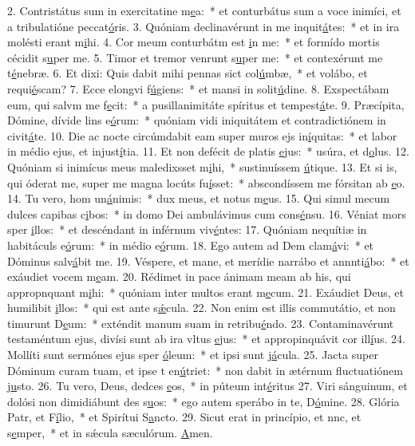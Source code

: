 2. Contristátus sum in exercitatine m\uline{e}a:~* et conturbátus sum a voce inimíci, et a tribulatióne peccat\uline{ó}ris.
3. Quóniam declinavérunt in me inquit\uline{á}tes:~* et in ira molésti erant m\uline{i}hi.
4. Cor meum conturbátm est \uline{i}n me:~* et formído mortis cécidit s\uline{u}per me.
5. Timor et tremor venrunt s\uline{u}per me:~* et contexérunt me t\uline{é}nebræ.
6. Et dixi: Quis dabit mihi pennas sict col\uline{ú}mbæ,~* et volábo, et requi\uline{é}scam?
7. Ecce elongvi f\uline{ú}giens:~* et mansi in solit\uline{ú}dine.
8. Exspectábam eum, qui salvm me f\uline{e}cit:~* a pusillanimitáte spíritus et tempest\uline{á}te.
9. Præcípita, Dómine, dívide lins e\uline{ó}rum:~* quóniam vidi iniquitátem et contradictiónem in civit\uline{á}te.
10. Die ac nocte circúmdabit eam super muros ejs in\uline{í}quitas:~* et labor in médio ejus, et injust\uline{í}tia.
11. Et non defécit de platis \uline{e}jus:~* usúra, et d\uline{o}lus.
12. Quóniam si inimícus meus maledixsset m\uline{i}hi,~* sustinuíssem \uline{ú}tique.
13. Et si is, qui óderat me, super me magna locúts fu\uline{í}sset:~* abscondíssem me fórsitan ab \uline{e}o.
14. Tu vero, hom un\uline{á}nimis:~* dux meus, et notus m\uline{e}us.
15. Qui simul mecum dulces capibas c\uline{i}bos:~* in domo Dei ambulávimus cum cons\uline{é}nsu.
16. Véniat mors sper \uline{i}llos:~* et descéndant in inférnum viv\uline{é}ntes:
17. Quóniam nequítiæ in habitáculs e\uline{ó}rum:~* in médio e\uline{ó}rum.
18. Ego autem ad Dem clam\uline{á}vi:~* et Dóminus salv\uline{á}bit me.
19. Véspere, et mane, et merídie narrábo et annnti\uline{á}bo:~* et exáudiet vocem m\uline{e}am.
20. Rédimet in pace ánimam meam ab his, qui appropnquant m\uline{i}hi:~* quóniam inter multos erant m\uline{e}cum.
21. Exáudiet Deus, et humilibit \uline{i}llos:~* qui est ante s\uline{ǽ}cula.
22. Non enim est illis commutátio, et non timurunt D\uline{e}um:~* exténdit manum suam in retribu\uline{é}ndo.
23. Contaminavérunt testaméntum ejus, divísi sunt ab ira vltus \uline{e}jus:~* et appropinquávit cor ill\uline{í}us.
24. Mollíti sunt sermónes ejus sper \uline{ó}leum:~* et ipsi sunt j\uline{á}cula.
25. Jacta super Dóminum curam tuam, et ipse t en\uline{ú}triet:~* non dabit in ætérnum fluctuatiónem j\uline{u}sto.
26. Tu vero, Deus, dedces \uline{e}os,~* in púteum int\uline{é}ritus
27. Viri sánguinum, et dolósi non dimidiábunt des s\uline{u}os:~* ego autem sperábo in te, D\uline{ó}mine.
28. Glória Patr, et F\uline{í}lio,~* et Spirítui S\uline{a}ncto.
29. Sicut erat in princípio, et nnc, et s\uline{e}mper,~* et in sǽcula sæculórum. \uline{A}men.
